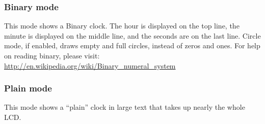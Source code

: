\subsubsection{Binary mode}
This mode shows a Binary clock.
The hour is displayed on the top line, the minute is displayed on the middle
line, and the seconds are on the last line.
Circle mode, if enabled, draws empty and full circles, instead of zeros and ones.
For help on reading binary, please visit:
\url{http://en.wikipedia.org/wiki/Binary_numeral_system}

\subsubsection{Plain mode}
This mode shows a ``plain'' clock in large text that takes up nearly the whole LCD.
